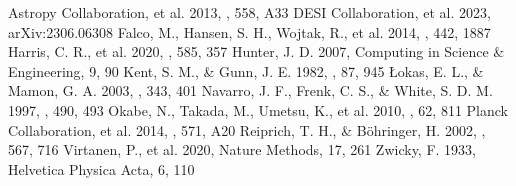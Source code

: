\documentclass[twocolumn]{aastex631}
\begin{document}
\begin{thebibliography}{}
	 Astropy Collaboration, et al. 2013, \aap, 558, A33
	 DESI Collaboration, et al. 2023, arXiv:2306.06308
	 Falco, M., Hansen, S. H., Wojtak, R., et al. 2014, \mnras, 442, 1887
	 Harris, C. R., et al. 2020, \nat, 585, 357
	 Hunter, J. D. 2007, Computing in Science \& Engineering, 9, 90
	 Kent, S. M., \& Gunn, J. E. 1982, \aj, 87, 945
	 Łokas, E. L., \& Mamon, G. A. 2003, \mnras, 343, 401
	 Navarro, J. F., Frenk, C. S., \& White, S. D. M. 1997, \apj, 490, 493
	 Okabe, N., Takada, M., Umetsu, K., et al. 2010, \pasj, 62, 811
	 Planck Collaboration, et al. 2014, \aap, 571, A20
	 Reiprich, T. H., \& Böhringer, H. 2002, \apj, 567, 716
	 Virtanen, P., et al. 2020, Nature Methods, 17, 261
	 Zwicky, F. 1933, Helvetica Physica Acta, 6, 110
\end{thebibliography}
\end{document}
